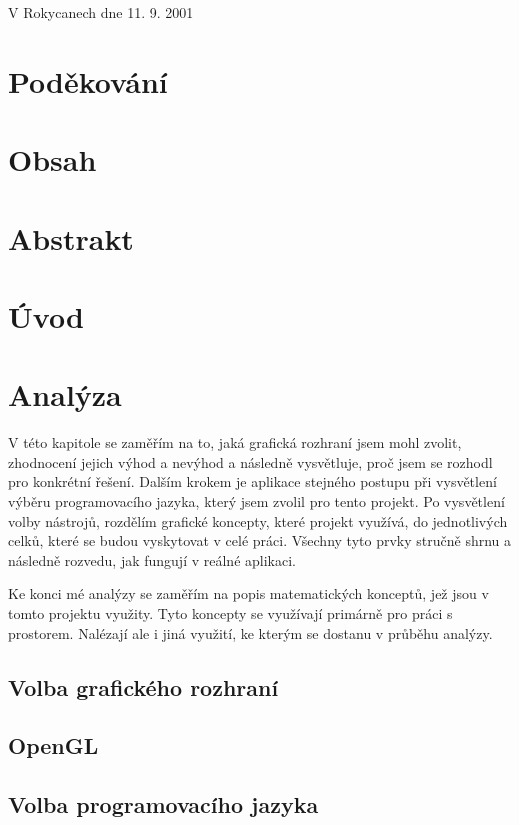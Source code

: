 \documentclass[12pt]{article}
\makeatletter
\renewcommand\tableofcontents{%
	\@starttoc{toc}%
}
\makeatother
\begin{document}
\vspace{24pt}
\noindent
V Rokycanech dne 11. 9. 2001
\pagebreak

\section{Poděkování}
\pagebreak

\section{Obsah}
\tableofcontents
\pagebreak

\section{Abstrakt}

\section{Úvod}

\section{Analýza}

V této kapitole se zaměřím na to, jaká grafická rozhraní jsem mohl zvolit, zhodnocení jejich výhod a nevýhod a následně vysvětluje, proč jsem se rozhodl pro konkrétní řešení. Dalším krokem je aplikace stejného postupu při vysvětlení výběru programovacího jazyka, který jsem zvolil pro tento projekt. Po vysvětlení volby nástrojů, rozdělím grafické koncepty, které projekt využívá, do jednotlivých celků, které se budou vyskytovat v celé práci. Všechny tyto prvky stručně shrnu a následně rozvedu, jak fungují v reálné aplikaci.

Ke konci mé analýzy se zaměřím na popis matematických konceptů, jež jsou v tomto projektu využity. Tyto koncepty se využívají primárně pro práci s prostorem. Nalézají ale i jiná využití, ke kterým se dostanu v průběhu analýzy.

\subsection{Volba grafického rozhraní}

\subsection{OpenGL}

\subsection{Volba programovacího jazyka}
\end{document}
